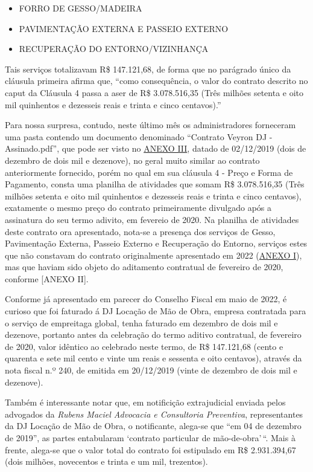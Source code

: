 \documentclass[
  letterpaper,
  DIV=11,
  numbers=noendperiod]{scrreprt}
\providecommand{\tightlist}{%
  \setlength{\itemsep}{0pt}\setlength{\parskip}{0pt}}
\begin{document}
\begin{itemize}
\tightlist
\item
  FORRO DE GESSO/MADEIRA
\item
  PAVIMENTAÇÃO EXTERNA E PASSEIO EXTERNO
\item
  RECUPERAÇÃO DO ENTORNO/VIZINHANÇA
\end{itemize}

Tais serviços totalizavam R\$ 147.121,68, de forma que no parágrado
único da cláusula primeira afirma que, ``como consequência, o valor do
contrato descrito no caput da Cláusula 4 passa a aser de R\$
3.078.516,35 (Três milhões setenta e oito mil quinhentos e dezesseis
reais e trinta e cinco centavos).''

Para nossa surpresa, contudo, neste último mês os administradores
forneceram uma pasta contendo um documento denominado ``Contrato Veyron
DJ - Assinado.pdf'', que pode ser visto no \hyperref[anexo-iii]{ANEXO
III}, datado de 02/12/2019 (dois de dezembro de dois mil e dezenove), no
geral muito similar ao contrato anteriormente fornecido, porém no qual
em sua cláusula 4 - Preço e Forma de Pagamento, consta uma planilha de
atividades que somam R\$ 3.078.516,35 (Três milhões setenta e oito mil
quinhentos e dezesseis reais e trinta e cinco centavos), exatamente o
mesmo preço do contrato primeiramente divulgado após a assinatura do seu
termo adivito, em fevereio de 2020. Na planilha de atividades deste
contrato ora apresentado, nota-se a presença dos serviços de Gesso,
Pavimentação Externa, Passeio Externo e Recuperação do Entorno, serviços
estes que não constavam do contrato originalmente apresentado em 2022
(\hyperref[anexo-i]{ANEXO I}), mas que haviam sido objeto do aditamento
contratual de fevereiro de 2020, conforme {[}ANEXO II{]}.

Conforme já apresentado em parecer do Conselho Fiscal em maio de 2022, é
curioso que foi faturado á DJ Locação de Mão de Obra, empresa contratada
para o serviço de empreitaga global, tenha faturado em dezembro de dois
mil e dezenove, portanto antes da celebração do termo aditivo
contratual, de fevereiro de 2020, valor idêntico ao celebrado neste
termo, de R\$ 147.121,68 (cento e quarenta e sete mil cento e vinte um
reais e sessenta e oito centavos), através da nota fiscal n.º 240, de
emitida em 20/12/2019 (vinte de dezembro de dois mil e dezenove).

Também é interessante notar que, em notificição extrajudicial enviada
pelos advogados da \emph{Rubens Maciel Advocacia e Consultoria
Preventiva}, representantes da DJ Locação de Mão de Obra, o notificante,
alega-se que ``em 04 de dezembro de 2019'', as partes entabularam
`contrato particular de mão-de-obra'\,``. Mais à frente, alega-se que o
valor total do contrato foi estipulado em R\$ 2.931.394,67 (dois
milhões, novecentos e trinta e um mil, trezentos).
\end{document}
